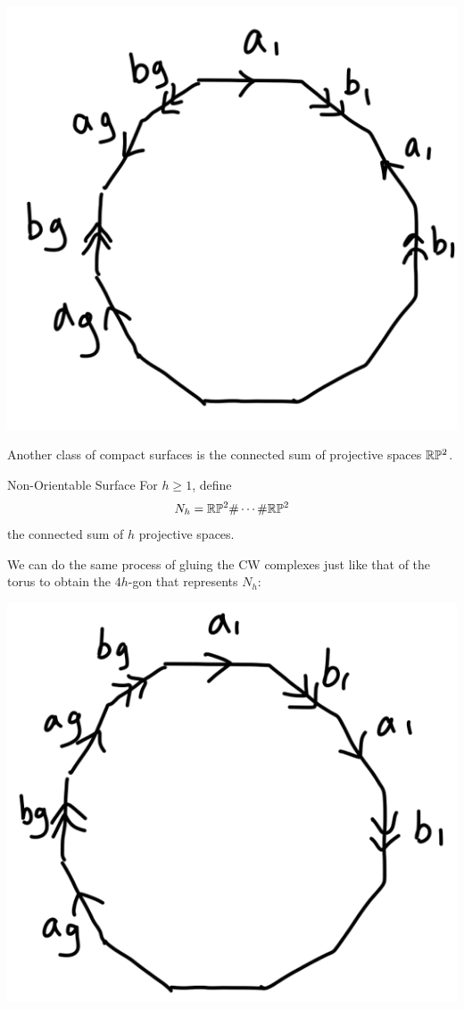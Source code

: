 \documentclass[a4paper]{article}
\begin{document}
\begin{center}
\includegraphics[scale = 0.3]{Image 2}
\end{center}

Another class of compact surfaces is the connected sum of projective spaces $\mathbb{R}\mathbb{P}^2$. 

\begin{defn}{Non-Orientable Surface}{} For $h\geq 1$, define $$N_h=\mathbb{R}\mathbb{P}^2\#\cdots\#\mathbb{R}\mathbb{P}^2$$ the connected sum of $h$ projective spaces. 
\end{defn}

We can do the same process of gluing the CW complexes just like that of the torus to obtain the $4h$-gon that represents $N_h$: 

\begin{center}
\includegraphics[scale = 0.3]{Image 3}
\end{center}
\end{document}
